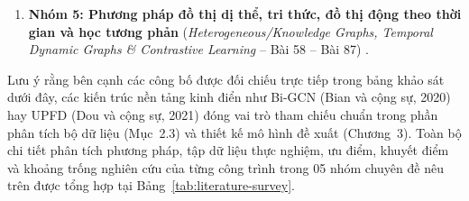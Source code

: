 \documentclass[11pt,a4paper]{extreport}
\begin{document}
\begin{enumerate}[itemsep=2pt, topsep=2pt, parsep=0pt, leftmargin=1.0cm]
    \item \textbf{Nhóm 5: Phương pháp đồ thị dị thể, tri thức, đồ thị động theo thời gian và học tương phản} (\textit{Heterogeneous/Knowledge Graphs, Temporal Dynamic Graphs \& Contrastive Learning} -- Bài 58 -- Bài 87) \cite{lin_unified_2023, noauthor_kagn_2023, noauthor_pesto_2023, zhang_rumor_2023, cui_propagation_2024, noauthor_claimver_2024, noauthor_continuous-time_2024, noauthor_deciphering_2024, noauthor_detection_2024, noauthor_heterogeneous_2024, noauthor_real-time_2024, tao_out--distribution_2024, tao_semantic_2024, zhang_rumor_2024, cui_graph_2025, noauthor_co-attention_2025, noauthor_dual_2025, noauthor_fgdgnn_2025, noauthor_heterogeneous_2025, noauthor_improving_2025, noauthor_msdsi-fnd_2025, noauthor_proactive_2025, noauthor_rumor_2025, noauthor_semantic_2025, noauthor_semantic_2025-1, noauthor_swam_2025, noauthor_towards_2025, noauthor_unsupervised_2025, wu_rumor_2025, tao_llm-enhanced_2026}.
\end{enumerate}

Lưu ý rằng bên cạnh các công bố được đối chiếu trực tiếp trong bảng khảo sát dưới đây, các kiến trúc nền tảng kinh điển như Bi-GCN (Bian và cộng sự, 2020) hay UPFD (Dou và cộng sự, 2021) đóng vai trò tham chiếu chuẩn trong phần phân tích bộ dữ liệu (Mục~2.3) và thiết kế mô hình đề xuất (Chương~3). Toàn bộ chi tiết phân tích phương pháp, tập dữ liệu thực nghiệm, ưu điểm, khuyết điểm và khoảng trống nghiên cứu của từng công trình trong 05 nhóm chuyên đề nêu trên được tổng hợp tại Bảng~\ref{tab:literature-survey}.
\end{document}

